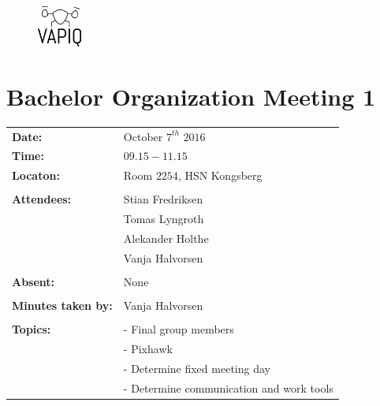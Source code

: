 \documentclass{article}
\begin{document}
\begin{figure}
\begin{center}
\includegraphics[width=0.13\textwidth]{VAPIQ-PICTURES/Logo2_Tilted.png} %
\advance{}
\end{center}
\end{figure}

\section*{Bachelor Organization Meeting 1}   


\begin{tabular}{ll}                                         \\
\textbf{Date:} 	            & October $7^{th}$ $2016$	    \\
\textbf{Time:}	        	& $09.15-11.15$				    \\
\textbf{Locaton:}       	& Room $2254$, HSN Kongsberg    \\\\
\textbf{Attendees:}         & Stian Fredriksen			    \\
				        	& Tomas Lyngroth			    \\  
				        	& Alekander Holthe 		    	\\
				        	& Vanja Halvorsen		    	\\\\
\textbf{Absent:}		    & None 						    \\\\
\textbf{Minutes taken by:}	& Vanja Halvorsen		        \\\\
\textbf{Topics:}	        & - Final group members         \\	
                            & - Pixhawk                     \\
                            & - Determine fixed meeting day \\
                            & - Determine communication and work tools \\
\end{tabular}                                               \\\\\\\\\\
\end{document}
